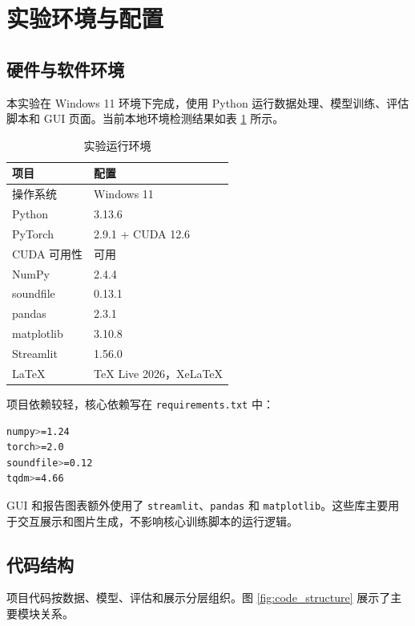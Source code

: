\section{实验环境与配置}

\subsection{硬件与软件环境}

本实验在 Windows 11 环境下完成，使用 Python 运行数据处理、模型训练、评估脚本和 GUI 页面。当前本地环境检测结果如表 \ref{tab:env} 所示。

\begin{table}[H]
    \centering
    \caption{实验运行环境}
    \label{tab:env}
    \begin{tabular}{ll}
        \toprule
        项目 & 配置 \\
        \midrule
        操作系统 & Windows 11 \\
        Python & 3.13.6 \\
        PyTorch & 2.9.1 + CUDA 12.6 \\
        CUDA 可用性 & 可用 \\
        NumPy & 2.4.4 \\
        soundfile & 0.13.1 \\
        pandas & 2.3.1 \\
        matplotlib & 3.10.8 \\
        Streamlit & 1.56.0 \\
        LaTeX & TeX Live 2026，XeLaTeX \\
        \bottomrule
    \end{tabular}
\end{table}

项目依赖较轻，核心依赖写在 \texttt{requirements.txt} 中：

\begin{lstlisting}[language=bash, caption={Python 依赖配置}]
numpy>=1.24
torch>=2.0
soundfile>=0.12
tqdm>=4.66
\end{lstlisting}

GUI 和报告图表额外使用了 \texttt{streamlit}、\texttt{pandas} 和 \texttt{matplotlib}。这些库主要用于交互展示和图片生成，不影响核心训练脚本的运行逻辑。

\subsection{代码结构}

项目代码按数据、模型、评估和展示分层组织。图 \ref{fig:code_structure} 展示了主要模块关系。

